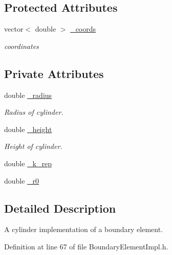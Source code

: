 \subsection*{Protected Attributes}
\begin{DoxyCompactItemize}
\item 
vector$<$ double $>$ \hyperlink{classBoundaryElement_ab51302e10e3e2def98438234ba5bf801}{\+\_\+coords}
\begin{DoxyCompactList}\small\item\em coordinates \end{DoxyCompactList}\end{DoxyCompactItemize}
\subsection*{Private Attributes}
\begin{DoxyCompactItemize}
\item 
double \hyperlink{classCylindricalZBoundaryElement_a09b2855b82606ae98f56e70eca516873}{\+\_\+radius}
\begin{DoxyCompactList}\small\item\em Radius of cylinder. \end{DoxyCompactList}\item 
double \hyperlink{classCylindricalZBoundaryElement_a5227f1150dc1a7dc212cfd4387e523fc}{\+\_\+height}
\begin{DoxyCompactList}\small\item\em Height of cylinder. \end{DoxyCompactList}\item 
double \hyperlink{classCylindricalZBoundaryElement_a4cdd06d2f2f1ac84e0ef6872c812b6cc}{\+\_\+k\+\_\+rep}
\item 
double \hyperlink{classCylindricalZBoundaryElement_a62b5ad9130b1cdeaa17ea3beaad760ef}{\+\_\+r0}
\end{DoxyCompactItemize}


\subsection{Detailed Description}
A cylinder implementation of a boundary element. 

Definition at line 67 of file Boundary\+Element\+Impl.\+h.




